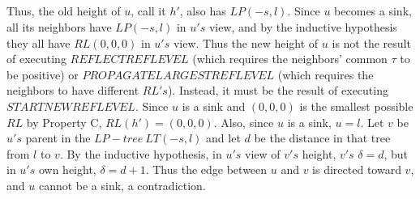 \subparagraph{}Thus, the old height of $u$, call it $h'$, also has $LP (-s, l)$. Since $u$ becomes a sink, all its neighbors have $LP (-s, l)$ in $u's$ view, and by the inductive hypothesis they all have $RL (0, 0, 0)$ in $u's$ view. Thus the new height of $u$ is not the result of executing $REFLECTREFLEVEL$ (which requires the neighbors' common $\tau$ to be positive) or $PROPAGATELARGESTREFLEVEL$ (which requires the neighbors to have different $RL's$). Instead, it must be the result of executing $STARTNEWREFLEVEL$. Since $u$ is a sink and $(0, 0, 0)$ is the smallest possible $RL$ by Property C, $RL(h' ) = (0, 0, 0)$. Also, since $u$ is a sink, $u = l$. Let $v$ be $u's$ parent in the $LP-tree~LT (-s, l)$ and let $d$ be the distance in that tree from $l$ to $v$. By the inductive hypothesis, in $u's$ view of $v's$ height, $v's$ $\delta = d$, but in $u's$ own height, $\delta = d + 1$. Thus the edge between $u$ and $v$ is directed toward $v$, and $u$ cannot be a sink, a contradiction.
